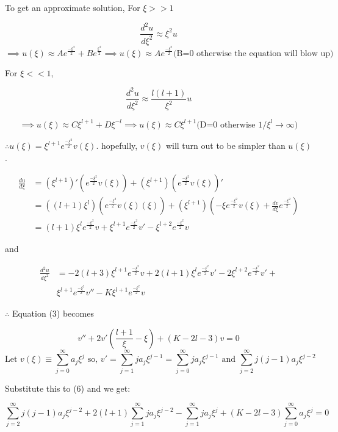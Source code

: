 \documentclass[a4paper,15pt]{article}
\begin{document}
To get an approximate solution, For \(\xi>>1\)

\[
  \frac{d^2u}{d \xi^2} \approx \xi^2 u
\]
\[
  \implies u(\xi)
  \approx Ae^{\frac{-\xi^2}{2}} + Be^{\frac{\xi^2}{2}}
  \implies u(\xi) \approx Ae^{\frac{-\xi^2}{2}} \text{(B=0 otherwise
  the equation will blow up)}
\]

For \(\xi<<1\),

\[\frac{d^2u}{d\xi^2} \approx \frac{l(l+1)}{\xi^2}u \]

\[ \implies u(\xi) \approx C\xi^{l+1}+D\xi^{-l} \implies u(\xi)
\approx C \xi^{l+1} \text{(D=0 otherwise } 1/\xi^l\to \infty)\]

\(\therefore u(\xi) = \xi^{l+1}e^{\frac{-\xi^2}{2}}v(\xi)\). hopefully,
$v(\xi)$ will turn out to be simpler than \(u(\xi)\).

\begin{align}
\frac{du}{d\xi} &= (\xi^{l+1})' (e^{\frac{-\xi^2}{2}}v(\xi))
 + (\xi^{l+1}) (e^{\frac{-\xi^2}{2}}v(\xi))' \nonumber \\
 &= ((l+1)\xi^{l})(e^{\frac{-\xi^2}{2}}v(\xi)(\xi))+(\xi^{l+1})(-\xi
 e^{\frac{-\xi^2}{2}}v(\xi)+\frac{dv}{d\xi}e^{\frac{-\xi^2}{2}}) \nonumber \\
 &= (l+1)\xi^l e^{\frac{-\xi^2}{2}}v + \xi^{l+1}e^{\frac{-\xi^2}{2}}v'-
 \xi^{l+2}e^{\frac{-\xi^2}{2}}v
\end{align}

and

\begin{align}
\frac{d^2u}{d\xi^2}
&=-2(l+3)\xi^{l+1}e^{\frac{-\xi^2}{2}}v+2(l+1)\xi^le^{\frac{-\xi^2}{2}}v'-
2\xi^{l+2}e^{\frac{-\xi^2}{2}}v'+ \nonumber \\ &\xi^{l+1}e^{\frac{-\xi^2}{2}}v''-K\xi^{l+1}
e^{\frac{-\xi^2}{2}}v
\end{align}

\(\therefore\) Equation (3) becomes

\begin{equation}
v''+2v'\left( \frac{l+1}{\xi}-\xi \right)+(K-2l-3)v=0
\end{equation}
\[
\text{Let } v(\xi) \equiv \sum_{j=0}^\infty a_j\xi^{j} \text{ so, } v' =
\sum_{j=1}^\infty j a_j\xi^{j-1}=\sum_{j=0}^\infty j a_j\xi^{j-1}\text
{ and }\sum_{j=2}^\infty j(j-1) a_j\xi^{j-2}
\]

Substitute this to (6) and we get:

\[
\sum_{j=2}^\infty j(j-1) a_j\xi^{j-2}+2(l+1)\sum_{j=1}^\infty j a_j\xi^{j-2}-
\sum_{j=1}^\infty j a_j\xi^{j}+(K-2l-3)\sum_{j=0}^\infty a_j\xi^{j} = 0
\]
\end{document}
